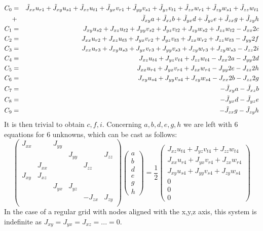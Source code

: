 \begin{eqnarray}
C_0 &=&
\tilde{J}_{xx} u_{r1} + \tilde{J}_{xy} u_{s1} + \tilde{J}_{xz} u_{t1} + 
\tilde{J}_{yx} v_{r1} + \tilde{J}_{yy} v_{s1} + \tilde{J}_{yz} v_{t1} + 
\tilde{J}_{zx} w_{r1} + \tilde{J}_{zy} w_{s1} + \tilde{J}_{zz} w_{t1} \nn\\
&+&\tilde{J}_{xy} a+\tilde{J}_{xz} b + \tilde{J}_{yx} d + \tilde{J}_{yz} e + \tilde{J}_{zx} g + \tilde{J}_{zy} h \nn\\
C_1 &=& 
J_{xy} u_{s2} + J_{xz} u_{t2} + 
J_{yy} v_{s2} + J_{yz} v_{t2} + 
J_{zy} w_{s2} + J_{zz} w_{t2} -J_{xx} 2c \nn \\ %
C_2 &=&
J_{xx} u_{r2} + J_{xz} u_{t3} +
J_{yx} v_{r2} + J_{yz} v_{t3} +
J_{zx} w_{r2} + J_{zz} w_{t3} -J_{yy} 2f \nn\\ %
C_3 &=&
J_{xx} u_{r3} + J_{xy} u_{s3} +
J_{yx} v_{r3} + J_{yy} v_{s3} +
J_{zy} w_{r3} + J_{zy} w_{s3} -J_{zz} 2i \nn\\ %
C_4 &=& J_{xz} u_{t4} + J_{yz} v_{t4} + J_{zz} w_{t4} -J_{xx} 2a - J_{yy} 2d  \nn\\ %
C_5 &=& J_{xx} u_{r4} + J_{yx} v_{r4} + J_{zx} w_{r4} -J_{yy} 2e - J_{zz} 2h  \nn\\ %
C_6 &=& J_{xy} u_{s4} + J_{yy} v_{s4} + J_{zy} w_{s4} -J_{xx} 2b - J_{zz} 2g  \nn\\ %
C_7 &=& - \tilde{J}_{xy} a - \tilde{J}_{xz} b  \nn\\ %
C_8 &=& - \tilde{J}_{yx} d - \tilde{J}_{yz} e  \nn\\ %
C_9 &=& - \tilde{J}_{zx} g - \tilde{J}_{zy} h  \nn   %
\end{eqnarray}
It is then trivial to obtain $c,f,i$. 
Concerning $a,b,d,e,g,h$ we are left with 6 equations for 6 unknowns, which can be cast as follows:
\[
\left(
\begin{array}{cccccc}
J_{xx} & & J_{yy} & & & \\
 & & & J_{yy} & &  J_{zz}\\ 
 & J_{xx} & & & J_{zz} & \\ 
J_{xy} &  J_{xz} & & & & \\ 
 & & J_{yx} & J_{yz} & \\ 
 & & & & -J_{zx} & J_{zy} \\ 
\end{array}
\right)
\left(
\begin{array}{c}
a \\b\\ d\\ e\\ g\\ h
\end{array}
\right)
=
\frac{1}{2}
\left(
\begin{array}{c}
 J_{xz} u_{t4} + J_{yz} v_{t4} + J_{zz} w_{t4} \\
 J_{xx} u_{r4} + J_{yx} v_{r4} + J_{zx} w_{r4} \\
 J_{xy} u_{s4} + J_{yy} v_{s4} + J_{zy} w_{s4} \\
 0 \\ 0 \\  0
\end{array}
\right)
\]
In the case of a regular grid with nodes aligned with the x,y,z axis, this 
system is indefinite as $J_{xy}=J_{yx}=J_{xz}=...=0$.

